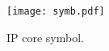 \begin{figure}[!htbp]
  \centerline{\texttt{[image: symb.pdf]}}
  \vspace{0cm}
  \caption{IP core symbol.}
  \label{fig:symbol}
\end{figure}
